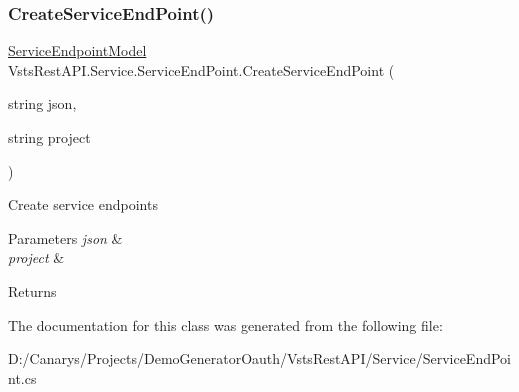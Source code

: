 \subsubsection{\texorpdfstring{Create\+Service\+End\+Point()}{CreateServiceEndPoint()}}
{\footnotesize\ttfamily \mbox{\hyperlink{class_vsts_rest_a_p_i_1_1_viewmodel_1_1_service_1_1_service_endpoint_model}{Service\+Endpoint\+Model}} Vsts\+Rest\+A\+P\+I.\+Service.\+Service\+End\+Point.\+Create\+Service\+End\+Point (\begin{DoxyParamCaption}\item[{string}]{json,  }\item[{string}]{project }\end{DoxyParamCaption})}



Create service endpoints 


\begin{DoxyParams}{Parameters}
{\em json} & \\
\hline
{\em project} & \\
\hline
\end{DoxyParams}
\begin{DoxyReturn}{Returns}

\end{DoxyReturn}


The documentation for this class was generated from the following file\+:\begin{DoxyCompactItemize}
\item 
D\+:/\+Canarys/\+Projects/\+Demo\+Generator\+Oauth/\+Vsts\+Rest\+A\+P\+I/\+Service/Service\+End\+Point.\+cs\end{DoxyCompactItemize}
